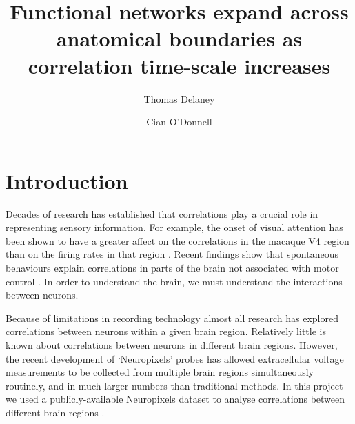 \documentclass[a4paper,12pt]{article}
\title{Functional networks expand across anatomical boundaries as correlation time-scale increases}
\date{}
\author[1]{Thomas Delaney}
\author[1]{Cian O'Donnell}
\affil[1]{School of Computer Science, Electrical and Electronic Engineering, and Engineering Mathematics, University of Bristol, Bristol, United Kingdom.}
\theoremstyle{definition}
\begin{document}
\maketitle



\section{Introduction}
Decades of research has established that correlations play a crucial role in representing sensory information. For example, the onset of visual attention has been shown to have a greater affect on the correlations in the macaque V4 region than on the firing rates in that region \cite{cohen1}. Recent findings show that spontaneous behaviours explain correlations in parts of the brain not associated with motor control \cite{stringer}. In order to understand the brain, we must understand the interactions between neurons.

Because of limitations in recording technology almost all research has explored correlations between neurons within a given brain region. Relatively little is known about correlations between neurons in different brain regions. However, the recent development of `Neuropixels' probes \cite{jun} has allowed extracellular voltage measurements to be collected from multiple brain regions simultaneously routinely, and in much larger numbers than traditional methods. In this project we used a publicly-available Neuropixels dataset to analyse correlations between different brain regions \cite{stringer}.
\end{document}
